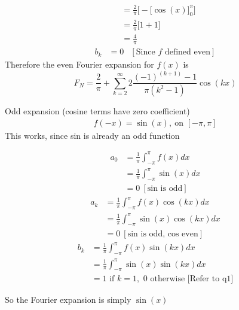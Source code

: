 \documentclass{article}
\begin{document}
\begin{enumerate}
\begin{multicols}{2}
\begin{align*}
        &= \frac{2}{\pi}\Bigg[- \Big[\cos(x)\Big]_{0}^{\pi} \Bigg] \\ 
        &= \frac{2}{\pi} \Bigg[ 1 + 1 \Bigg] \\ 
        &= \frac{4}{\pi}
    \end{align*}
    \begin{align*}
        b_k &= 0 & [\text{Since $f$ defined even}]
    \end{align*}
        Therefore the even Fourier expansion for $f(x)$ is 
        \[
            F_N = \frac{2}{\pi} + \sum_{k=2}^{\infty} 2\frac{(-1)^{(k+1)} -1}{\pi(k^2 - 1)}\cos(kx)
        \]

    \end{multicols}
    \newpage
    Odd expansion (cosine terms have zero coefficient)
    \begin{align*}
        f(-x) = \sin(x), \: \text{on }[-\pi, \pi]
    \end{align*}
    This works, since sin is already an odd function
    \begin{multicols}{2}
    \noindent
    \begin{align*}
        a_0 &= \frac{1}{\pi}\int_{-\pi}^{\pi}f(x)dx \\ 
        &= \frac{1}{\pi}\int_{-\pi}^{\pi}\sin(x)dx \\ 
        &= 0 \: [\text{sin is odd}]
    \end{align*}
    \begin{align*}
        a_k &= \frac{1}{\pi}\int_{-\pi}^{\pi}f(x)\cos(kx)dx \\ 
        &= \frac{1}{\pi}\int_{-\pi}^{\pi}\sin(x)\cos(kx)dx \\ 
        &= 0 \: [\text{sin is odd, cos even}]
    \end{align*}
    \begin{align*}
        b_k &= \frac{1}{\pi}\int_{-\pi}^{\pi}f(x)\sin(kx)dx \\ 
        &= \frac{1}{\pi}\int_{-\pi}^{\pi}\sin(x)\sin(kx)dx \\ 
        &= 1 \text{ if } k = 1, \text{ 0 otherwise [Refer to q1]}
    \end{align*}
    \end{multicols}
    So the Fourier expansion is simply $\sin(x)$
\end{enumerate}

    \newpage
\end{document}
